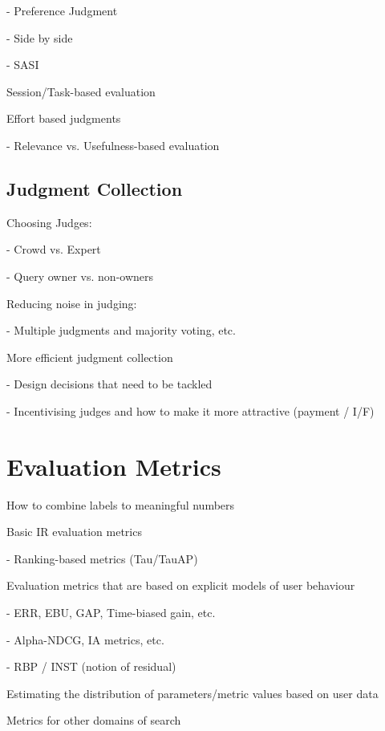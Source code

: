 \documentclass[openany]{now} %
\newcommand{\newpar}{\bigskip\noindent}
\begin{document}
- Preference Judgment  \cite{Chandar2013} \cite{CarteretteBCD08}

- Side by side \cite{Thomas2006} \cite{Kim:2013}

- SASI \cite{Bailey2010} 

\newpar
Session/Task-based evaluation \cite{Moraveji:2011} \cite{Xu:2009}

\newpar
Effort based judgments \cite{Yilmaz:2014}

- Relevance vs. Usefulness-based evaluation 

\section{Judgment Collection}

Choosing Judges: 

- Crowd vs. Expert \cite{Kazai:2013} \cite{Alonso20121053}

- Query owner vs. non-owners \cite{Chouldechova:2013}

\newpar
Reducing noise in judging: 

- Multiple judgments and majority voting, etc. \cite{Venanzi:2014}

\newpar
More efficient judgment collection

-	Design decisions that need to be tackled  \cite{Blanco:2011} \cite{Kazai2012} \cite{Alonso2012} \cite{Alonso:2015} \cite{Scholer:2013} 

-	Incentivising judges and how to make it more attractive (payment / I/F)
\cite{Megorskaya2015} \cite{Davtyan2015}  \cite{Rokicki:2014}  \cite{Eickhoff:2012}

\chapter{Evaluation Metrics}
How to combine labels to meaningful numbers


Basic IR evaluation metrics

-	Ranking-based metrics (Tau/TauAP)

\newpar
Evaluation metrics that are based on explicit models of user behaviour

-	ERR, EBU, GAP, Time-biased gain, etc.

-	Alpha-NDCG, IA metrics, etc.

-	RBP / INST (notion of residual)

\newpar
Estimating the distribution of parameters/metric values based on user data

\newpar
Metrics for other domains of search
\end{document}
